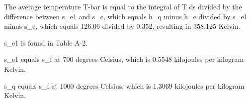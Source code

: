 The average temperature T-bar is equal to the integral of T ds divided by the difference between s_e1 and s_c, which equals h_q minus h_e divided by s_e1 minus s_c, which equals 126.06 divided by 0.352, resulting in 358.125 Kelvin.

s_e1 is found in Table A-2.

s_e1 equals s_f at 700 degrees Celsius, which is 0.5548 kilojoules per kilogram Kelvin.

s_q equals s_f at 1000 degrees Celsius, which is 1.3069 kilojoules per kilogram Kelvin.